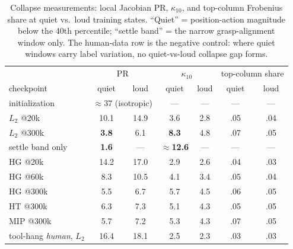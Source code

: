\documentclass[11pt]{article}
\begin{document}
\begin{table}[h]\centering\small
\begin{tabular}{lcccccc}
\toprule
 & \multicolumn{2}{c}{PR} & \multicolumn{2}{c}{$\kappa_{10}$} & \multicolumn{2}{c}{top-column share} \\
checkpoint & quiet & loud & quiet & loud & quiet & loud \\
\midrule
initialization            & \multicolumn{2}{c}{$\approx 37$ (isotropic)} & --- & --- & --- & --- \\
$L_2$ @20k                & 10.1 & 14.9 & 3.6 & 2.8 & .05 & .04 \\
$L_2$ @300k               & \textbf{3.8} & 6.1 & \textbf{8.3} & 4.8 & .07 & .05 \\
\quad settle band only    & \textbf{1.6} & --- & $\approx$\textbf{12.6} & --- & --- & --- \\
HG @20k                   & 14.2 & 17.0 & 2.9 & 2.6 & .04 & .03 \\
HG @60k                   & 8.3 & 10.5 & 4.1 & 3.4 & .05 & .04 \\
HG @300k                  & 5.5 & 6.7 & 5.7 & 4.5 & .06 & .05 \\
HT @300k                  & 6.3 & 7.3 & 5.1 & 4.3 & .05 & .05 \\
MIP @300k                 & 5.7 & 7.2 & 5.3 & 4.3 & .07 & .05 \\
\midrule
tool-hang \emph{human}, $L_2$ & 16.4 & 18.1 & 2.5 & 2.3 & .03 & .03 \\
\bottomrule
\end{tabular}
\caption{Collapse measurements: local Jacobian PR, $\kappa_{10}$, and
top-column Frobenius share at quiet vs.\ loud training states. ``Quiet'' =
position-action magnitude below the 40th percentile; ``settle band'' = the
narrow grasp-alignment window only. The human-data row is the negative
control: where quiet windows carry label variation, no quiet-vs-loud
collapse gap forms.}
\label{tab:collapse}
\end{table}
\end{document}
